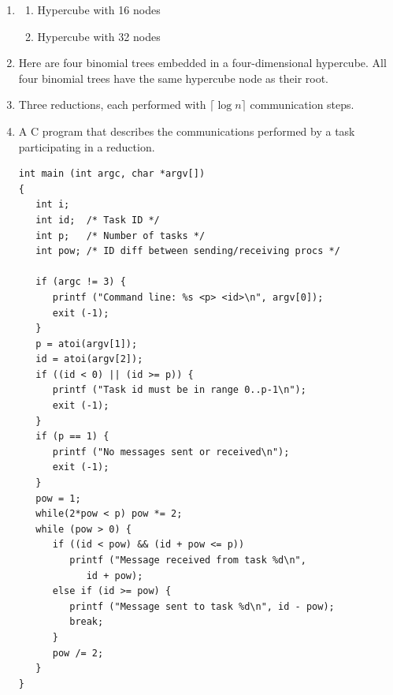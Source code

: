 \begin{enumerate}
\item \begin{enumerate}

      \item Hypercube with 16 nodes

      \begin{center}
      \end{center}

      \item Hypercube with 32 nodes

      \begin{center}
      \end{center}

      \end{enumerate}

\item Here are four binomial trees embedded in a four-dimensional hypercube.
      All four binomial trees have the same hypercube node as their root.

      \begin{center}
      \end{center}

\item Three reductions, each performed with $\lceil \log n\rceil$
      communication steps.

      \begin{center}
      \end{center}

\item A C program that describes the communications performed by a task
      participating in a reduction.

\begin{verbatim}
int main (int argc, char *argv[])
{
   int i;
   int id;  /* Task ID */
   int p;   /* Number of tasks */
   int pow; /* ID diff between sending/receiving procs */

   if (argc != 3) {
      printf ("Command line: %s <p> <id>\n", argv[0]);
      exit (-1);
   }
   p = atoi(argv[1]);
   id = atoi(argv[2]);
   if ((id < 0) || (id >= p)) {
      printf ("Task id must be in range 0..p-1\n");
      exit (-1);
   }
   if (p == 1) {
      printf ("No messages sent or received\n");
      exit (-1);
   }
   pow = 1;
   while(2*pow < p) pow *= 2;
   while (pow > 0) {
      if ((id < pow) && (id + pow <= p))
         printf ("Message received from task %d\n",
            id + pow);
      else if (id >= pow) {
         printf ("Message sent to task %d\n", id - pow);
         break;
      }
      pow /= 2;
   }
}
\end{verbatim}


\end{enumerate}
